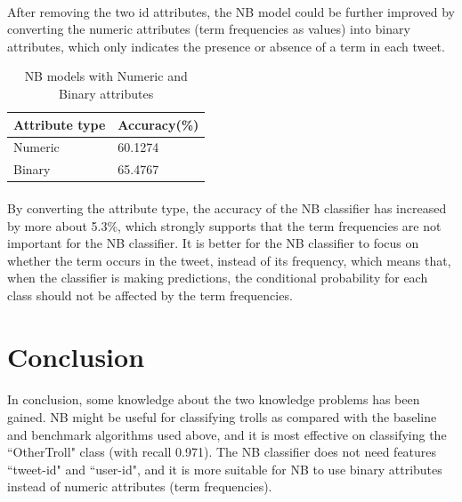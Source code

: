 \documentclass[11pt]{article}
\begin{document}
\paragraph{} After removing the two id attributes, the NB model could be further improved by converting the numeric attributes (term frequencies as values) into binary attributes, which only indicates the presence or absence of a term in each tweet.
\begin{table}[!htbp]
 \begin{center}
\begin{tabular}{| l | l |}
      \hline
      Attribute type & Accuracy(\%) \\
      \hline\hline
      Numeric & 60.1274 \\
      Binary & 65.4767 \\
      \hline
\end{tabular}
\caption{NB models with Numeric and Binary attributes}\label{table3}
 \end{center}
\end{table}

\paragraph{} By converting the attribute type, the accuracy of the NB classifier has increased by more about 5.3\%, which strongly supports that the term frequencies are not important for the NB classifier. It is better for the NB classifier to focus on whether the term occurs in the tweet, instead of its frequency, which means that, when the classifier is making predictions, the conditional probability for each class should not be affected by the term frequencies.

\section{Conclusion}
\paragraph{} In conclusion, some knowledge about the two knowledge problems has been gained. NB might be useful for classifying trolls as compared with the baseline and benchmark algorithms used above, and it is most effective on classifying the ``OtherTroll" class (with recall 0.971). The NB classifier does not need features ``tweet-id" and ``user-id", and it is more suitable for NB to use binary attributes instead of numeric attributes (term frequencies).

\printbibliography
\end{document}
